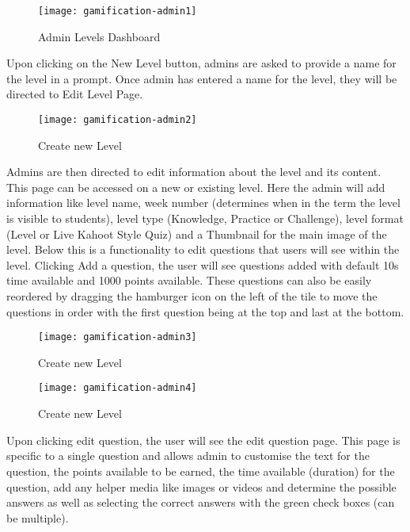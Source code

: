 \begin{figure}[h!]
    \texttt{[image: gamification-admin1]}
    \centering
    \caption{Admin Levels Dashboard}
\end{figure}

Upon clicking on the New Level button, admins are asked to provide a name for the level in a prompt. Once admin has entered a name for the level, they will be directed to Edit Level Page.

\begin{figure}[h!]
    \texttt{[image: gamification-admin2]}
    \centering
    \caption{Create new Level}
\end{figure}

\newpage

Admins are then directed to edit information about the level and its content. This page can be accessed on a new or existing level. Here the admin will add information like level name, week number (determines when in the term the level is visible to students), level type (Knowledge, Practice or Challenge), level format (Level or Live Kahoot Style Quiz) and a Thumbnail for the main image of the level. Below this is a functionality to edit questions that users will see within the level. Clicking Add a question, the user will see questions added with default 10s time available and 1000 points available. These questions can also be easily reordered by dragging the hamburger icon on the left of the tile to move the questions in order with the first question being at the top and last at the bottom.

\begin{figure}[h!]
    \texttt{[image: gamification-admin3]}
    \centering
    \caption{Create new Level}
\end{figure}

\begin{figure}[h!]
    \texttt{[image: gamification-admin4]}
    \centering
    \caption{Create new Level}
\end{figure}

\newpage

Upon clicking edit question, the user will see the edit question page. This page is specific to a single question and allows admin to customise the text for the question, the points available to be earned, the time available (duration) for the question, add any helper media like images or videos and determine the possible answers as well as selecting the correct answers with the green check boxes (can be multiple).

